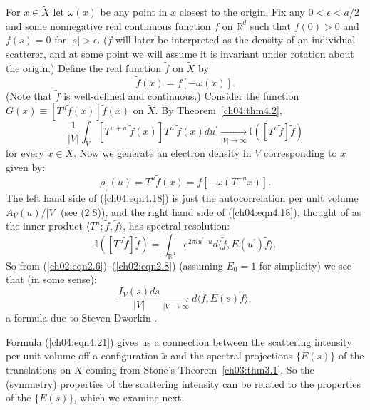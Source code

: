 \documentclass[reqno]{stml-l}
\theoremstyle{plain}
\theoremstyle{definition}
\numberwithin{equation}{chapter}
\begin{document}
For $x\in\tilde{X}$ let $\omega(x)$ be any point in $x$ closest to the origin. Fix any $0<\epsilon<a/2$ and some nonnegative real continuous function $f$ on $\mathbb{R}^{d}$ such that $f(0)>0$ and $f(s)=0$ for $|s|>\epsilon$. ($f$ will later be interpreted as the density of an individual scatterer, and at some point we will assume it is invariant under rotation about the origin.) Define the real function $\tilde{f}$ on $\tilde{X}$ by
\begin{equation}\label{ch04:eqn4.17}
\tilde{f}(x)=f[-\omega(x)].
\end{equation}
(Note that $\tilde{f}$ is well-defined and continuous.) Consider the function $G(x)\equiv[T^{u}\tilde{f}(x)]\tilde{f}(x)$ on $\tilde{X}$. By Theorem~\ref{ch04:thm4.2},
\begin{equation}\label{ch04:eqn4.18}
\frac{1}{|V|}\int_{V}[T^{u+u^{\prime}}\tilde{f}(x)]T^{u^{\prime}}\tilde{f}(x)du^{\prime}\mathop{\longrightarrow}\limits_{|V|\rightarrow\infty} \mathbb{I}([T^{u}\tilde{f}]\tilde{f})
\end{equation}
for every $x\in\tilde{X}$. Now we generate an electron density in $V$ corresponding to $x$ given by:
\begin{equation}\label{ch04:eqn4.19}
\rho_{_{V}}(u)=T^{u}\tilde{f}(x)=f[-\omega(T^{-u}x)].
\end{equation}
The left hand side of (\ref{ch04:eqn4.18}) is just the autocorrelation per unit volume $A_{V}(u)/|V|$ (see (2.8)), and the right hand side of (\ref{ch04:eqn4.18}), thought of as the inner product $\langle T^{u};\tilde{f},\tilde{f}\rangle$, has spectral resolution:
\begin{equation}\label{ch04:eqn4.20}
\mathbb{I}([T^{u}\tilde{f}]\tilde{f})=\int_{\mathbb{R}^{3}}e^{2\pi iu^{\prime}\cdot u}d\langle \tilde{f}, E(u^{\prime})\tilde{f}\rangle.
\end{equation}
So from (\ref{ch02:eqn2.6})--(\ref{ch02:eqn2.8}) (assuming $E_{0}=1$ for simplicity) we see that (in some sense):
\begin{equation}\label{ch04:eqn4.21}
\frac{I_{V}(s)ds}{|V|}\mathop{\longrightarrow}\limits_{|V|\rightarrow\infty} d\langle \tilde{f}, E(s)\tilde{f}\rangle,
\end{equation}
a formula due to Steven Dworkin \cite{bib:Dwo}.

Formula (\ref{ch04:eqn4.21}) gives us a connection between the scattering intensity per unit volume off a configuration $\tilde{x}$ and the spectral projections $\{E(s)\}$ of the translations on $\tilde{X}$ coming from Stone's Theorem~\ref{ch03:thm3.1}. So the (symmetry) properties of the scattering intensity can be related to the properties of the $\{E(s)\}$, which we examine next.
\end{document}

